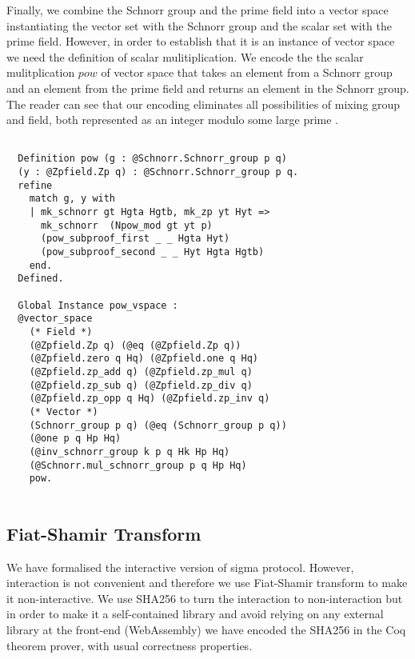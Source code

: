 \documentclass[conference,compsoc]{IEEEtran}
\begin{document}
Finally, we combine the Schnorr group and the prime field 
into a vector space instantiating the vector set with 
the Schnorr group and the scalar set with the prime field. 
However, in order to establish that it is an 
instance of vector space we need the definition 
of scalar mulitiplication. We encode the  
the scalar mulitplication $pow$ of 
vector space that takes an element from 
a Schnorr group and an element from 
the prime field and returns an element in the 
Schnorr group.  The reader can see that our encoding eliminates all 
possibilities of mixing group and field, both represented 
as an integer modulo some large 
prime \cite{10.1007/978-3-662-63958-0_24}.

\begin{lstlisting}[frame=single, language=Coq, caption={Definition of Natural Number},
  label={ind_nat},captionpos=t, basicstyle=\ttfamily\footnotesize,
  abovecaptionskip=-\medskipamount]

  Definition pow (g : @Schnorr.Schnorr_group p q) 
  (y : @Zpfield.Zp q) : @Schnorr.Schnorr_group p q.
  refine 
    match g, y with 
    | mk_schnorr gt Hgta Hgtb, mk_zp yt Hyt => 
      mk_schnorr  (Npow_mod gt yt p) 
      (pow_subproof_first _ _ Hgta Hyt)
      (pow_subproof_second _ _ Hyt Hgta Hgtb)
    end.
  Defined.

  Global Instance pow_vspace : 
  @vector_space 
    (* Field *)
    (@Zpfield.Zp q) (@eq (@Zpfield.Zp q))
    (@Zpfield.zero q Hq) (@Zpfield.one q Hq)
    (@Zpfield.zp_add q) (@Zpfield.zp_mul q)
    (@Zpfield.zp_sub q) (@Zpfield.zp_div q)
    (@Zpfield.zp_opp q Hq) (@Zpfield.zp_inv q)
    (* Vector *)
    (Schnorr_group p q) (@eq (Schnorr_group p q))
    (@one p q Hp Hq) 
    (@inv_schnorr_group k p q Hk Hp Hq)
    (@Schnorr.mul_schnorr_group p q Hp Hq)
    pow.
  
\end{lstlisting}
  
  
 
\subsection{Fiat-Shamir Transform}
 We have formalised the interactive version of sigma protocol. However,
 interaction is not convenient and therefore
 we use Fiat-Shamir transform to make it non-interactive. We use SHA256 
 to turn the interaction to non-interaction but in order to 
 make it a self-contained library and 
 avoid relying on any external library at the front-end (WebAssembly)
 we have encoded the SHA256 in the Coq theorem prover, with usual correctness 
 properties. 
\end{document}
